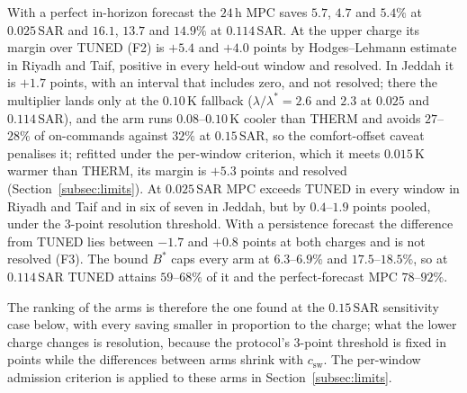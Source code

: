 \documentclass[3p,twocolumn,number]{elsarticle}
\newcommand{\csw}{c_{\mathrm{sw}}}
\newcommand{\SAR}{\text{SAR}}
\begin{document}
With a perfect in-horizon forecast the $24\,$h MPC saves $5.7$, $4.7$ and $5.4\%$ at $0.025\,\SAR$ and $16.1$, $13.7$ and $14.9\%$ at $0.114\,\SAR$. At the upper charge its margin over TUNED (F2) is $+5.4$ and $+4.0$ points by Hodges--Lehmann estimate in Riyadh and Taif, positive in every held-out window and resolved. In Jeddah it is $+1.7$ points, with an interval that includes zero, and not resolved; there the multiplier lands only at the $0.10\,$K fallback ($\lambda/\lambda^\ast=2.6$ and $2.3$ at $0.025$ and $0.114\,\SAR$), and the arm runs $0.08$--$0.10\,$K cooler than THERM and avoids $27$--$28\%$ of on-commands against $32\%$ at $0.15\,\SAR$, so the comfort-offset caveat penalises it; refitted under the per-window criterion, which it meets $0.015\,$K warmer than THERM, its margin is $+5.3$ points and resolved (Section~\ref{subsec:limits}). At $0.025\,\SAR$ MPC exceeds TUNED in every window in Riyadh and Taif and in six of seven in Jeddah, but by $0.4$--$1.9$ points pooled, under the $3$-point resolution threshold. With a persistence forecast the difference from TUNED lies between $-1.7$ and $+0.8$ points at both charges and is not resolved (F3). The bound $B^\ast$ caps every arm at $6.3$--$6.9\%$ and $17.5$--$18.5\%$, so at $0.114\,\SAR$ TUNED attains $59$--$68\%$ of it and the perfect-forecast MPC $78$--$92\%$.

The ranking of the arms is therefore the one found at the $0.15\,\SAR$ sensitivity case below, with every saving smaller in proportion to the charge; what the lower charge changes is resolution, because the protocol's $3$-point threshold is fixed in points while the differences between arms shrink with $\csw$. The per-window admission criterion is applied to these arms in Section~\ref{subsec:limits}.
\end{document}
